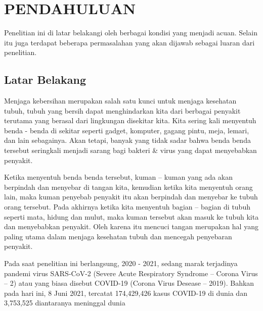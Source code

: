 \chapter{PENDAHULUAN}
\label{chap:pendahuluan}


Penelitian ini di latar belakangi oleh berbagai kondisi yang menjadi acuan. Selain itu juga terdapat beberapa permasalahan yang akan dijawab sebagai luaran dari penelitian.

\section{Latar Belakang}
\label{sec:latarbelakang}

Menjaga kebersihan merupakan salah satu kunci untuk menjaga kesehatan tubuh, tubuh yang bersih dapat menghindarkan kita dari berbagai penyakit terutama yang berasal dari lingkungan disekitar kita. Kita sering kali menyentuh benda - benda di sekitar seperti gadget, komputer, gagang pintu, meja, lemari, dan lain sebagainya. Akan tetapi, banyak yang tidak sadar bahwa benda benda tersebut seringkali menjadi sarang bagi bakteri \& virus yang dapat menyebabkan penyakit. 

Ketika menyentuh benda benda tersebut, kuman – kuman yang ada akan berpindah dan menyebar di tangan kita, kemudian ketika kita menyentuh orang lain, maka kuman penyebab penyakit itu akan berpindah dan menyebar ke tubuh orang tersebut. Pada akhirnya ketika kita menyentuh bagian – bagian di tubuh seperti mata, hidung dan mulut, maka kuman tersebut akan masuk ke tubuh kita dan menyebabkan penyakit. Oleh karena itu mencuci tangan merupakan hal yang paling utama dalam menjaga kesehatan tubuh dan mencegah penyebaran penyakit.

Pada saat penelitian ini berlangsung, 2020 - 2021, sedang marak terjadinya pandemi virus SARS-CoV-2 (Severe Acute Respiratory Syndrome – Corona Virus – 2) atau yang biasa disebut COVID-19 (Corona Virus Desease – 2019)\cite{cit:copid}. Bahkan pada hari ini, 8 Juni 2021, tercatat 174,429,426 kasus COVID-19 di dunia dan 3,753,525 diantaranya meninggal dunia \cite{cit:covidcase}

